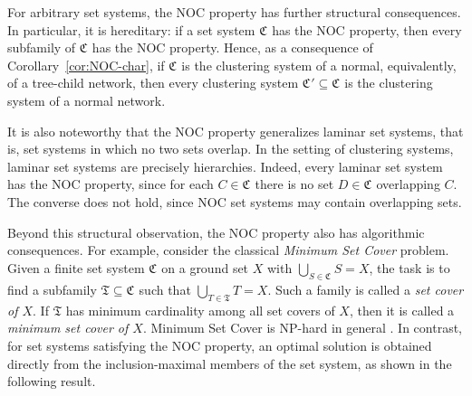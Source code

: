 \documentclass[preprint]{elsarticle}
\newcommand{\CS}[1][]{\ensuremath{\mathfrak{C}_{#1}}}
\newcommand{\Tsys}{\ensuremath{\mathfrak{T}}}
\begin{document}
For arbitrary set systems, the NOC property has further structural consequences. In
particular, it is hereditary: if a set system $\CS$ has the NOC property,
then every subfamily of $\CS$ has the NOC property. Hence,
as a consequence of Corollary~\ref{cor:NOC-char},
if $\CS$ is the clustering system of a normal, equivalently, of a tree-child network,
then every clustering system $\CS'\subseteq\CS$ is the clustering system of a normal network.

It is also noteworthy that the NOC property generalizes laminar set systems, that is, set systems
in which no two sets overlap. In the setting of clustering systems, laminar set systems are precisely
hierarchies. Indeed, every laminar set system has the NOC property, since for each $C\in\CS$ there
is no set $D\in\CS$ overlapping $C$. The converse does not hold, since NOC set systems may contain
overlapping sets.


Beyond this structural observation, the NOC property also has algorithmic consequences. For
example, consider the classical \emph{Minimum Set Cover} problem. Given a finite set system $\CS$
on a ground set $X$ with $\bigcup_{S\in\CS}S=X$, the task is to find a subfamily
$\Tsys\subseteq\CS$ such that $\bigcup_{T\in\Tsys}T=X$. Such a family is called a \emph{set cover
of $X$}. If $\Tsys$ has minimum cardinality among all set covers of $X$, then it is called a
\emph{minimum set cover of $X$}. Minimum Set Cover is NP-hard in general \cite{Karp:1972}.
In contrast, for set systems satisfying the NOC property, an optimal solution is obtained directly
from the inclusion-maximal members of the set system, as shown in the following result.
\end{document}

